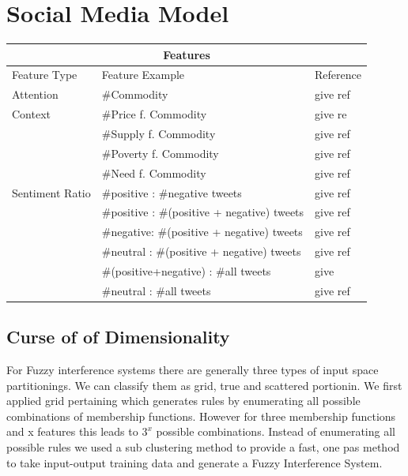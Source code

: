\clearpage

\section{Social Media Model}





\begin{tabular}{ |p{3cm}|p{8cm}|p{3cm}|  }
 \hline
 \multicolumn{3}{|c|}{Features } \\
 \hline
 Feature Type & Feature Example & Reference   \\
\hline
Attention & \#Commodity  & give ref \\
\hline
Context & \#Price f. Commodity   & give re \\
		& \#Supply f. Commodity   & give ref \\
		& \#Poverty f. Commodity   & give ref \\
		& \#Need f. Commodity   & give ref \\



  \hline
   Sentiment Ratio & \#positive : \#negative tweets  & give ref\\
      			     & \#positive : \#(positive + negative) tweets   &  give ref\\
 			     & \#negative: \#(positive + negative) tweets &  give ref  \\
			     & \#neutral : \#(positive + negative) tweets & give ref  \\
			     & \#(positive+negative) : \#all tweets & give  \\			     
			     & \#neutral : \#all tweets & give ref\\
                          
   \hline
   


\end{tabular}




\subsection{Curse of of Dimensionality}

For Fuzzy interference systems there are generally three types of input space partitionings. We can classify them as grid, true and scattered portionin. We first applied grid pertaining which generates rules by enumerating all possible combinations of membership functions. However for three membership functions and x features this leads to $3^x$ possible combinations. Instead of enumerating all possible rules we used a sub clustering method to provide a fast, one pas method to take input-output training data and generate a Fuzzy Interference System. 






